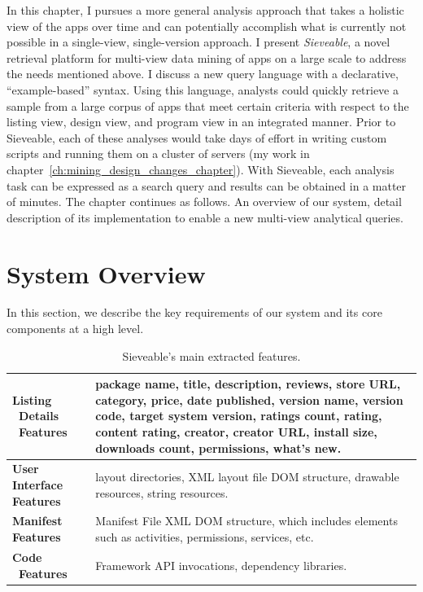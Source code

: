 In this chapter, I pursues a more general analysis approach that takes a holistic view of the apps over time and can potentially accomplish what is currently not possible in a single-view, single-version approach.
I present \emph{Sieveable}, a novel retrieval platform for multi-view data mining of apps on a large scale to address the needs mentioned above.
I discuss a new query language with a declarative, ``example-based'' syntax.
Using this language, analysts could quickly retrieve a sample from a large corpus of apps that meet certain criteria with respect to the listing view, design view, and program view in an integrated manner.
Prior to Sieveable, each of these analyses would take days of effort in writing custom scripts and running them on a cluster of servers (my work in chapter~\ref{ch:mining_design_changes_chapter}).
With Sieveable, each analysis task can be expressed as a search query and results can be obtained in a matter of minutes.
The chapter continues as follows. An overview of our system, detail description of its implementation to enable a new multi-view analytical queries.


\section{System Overview}
In this section, we describe the key requirements of our system and its core components at a high level.

\begin{table}[t]
	\def\arraystretch{2}
	\centering
	\begin{tabular}{|>{\raggedright}p{2cm}|p{12.5cm}|}
		\hline
		\textbf{Listing \ Details \ Features} &
		package name, title, description, reviews, store URL, category, price, date published, version name, version code, target system version, ratings count, rating, content rating, creator, creator URL, install size, downloads count, permissions, what's new.\\
		\hline
		\textbf{User Interface Features} &
		layout directories, XML layout file DOM structure, drawable resources, string resources.\\
		\hline
		\textbf{Manifest Features}&
		Manifest File XML DOM structure, which includes elements such as activities, permissions, services, etc.\\
		\hline
		\textbf{Code \ Features} & 
		Framework API invocations, dependency libraries.\\
		\hline
	\end{tabular}
	\caption{Sieveable's main extracted features.}
	\label{tab:table_features}
\end{table}

